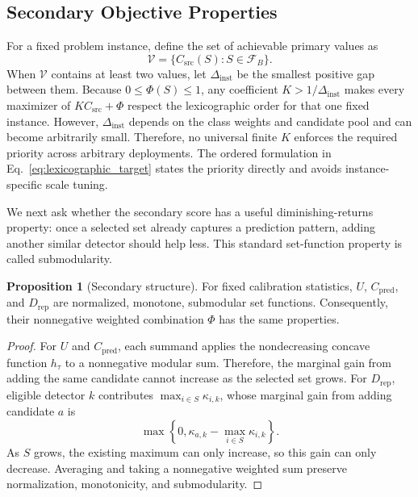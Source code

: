 \documentclass[conference]{IEEEtran}
\theoremstyle{definition}
\newtheorem{proposition}[theorem]{Proposition}
\begin{document}
\subsection{Secondary Objective Properties}
\label{app:secondary_structure}
For a fixed problem instance, define the set of achievable primary values as
\begin{equation}
\mathcal V=\{C_{\mathrm{src}}(S):S\in\mathcal F_B\}.
\end{equation}
When $\mathcal V$ contains at least two values, let $\Delta_{\mathrm{inst}}$ be the smallest positive gap between them.
Because $0\le\Phi(S)\le1$, any coefficient $K>1/\Delta_{\mathrm{inst}}$ makes every maximizer of $KC_{\mathrm{src}}+\Phi$ respect the lexicographic order for that one fixed instance.
However, $\Delta_{\mathrm{inst}}$ depends on the class weights and candidate pool and can become arbitrarily small.
Therefore, no universal finite $K$ enforces the required priority across arbitrary deployments.
The ordered formulation in Eq.~\ref{eq:lexicographic_target} states the priority directly and avoids instance-specific scale tuning.

We next ask whether the secondary score has a useful diminishing-returns property: once a selected set already captures a prediction pattern, adding another similar detector should help less.
This standard set-function property is called submodularity.
\begin{proposition}[Secondary structure]
\label{prop:secondary_structure}
For fixed calibration statistics, $U$, $C_{\mathrm{pred}}$, and $D_{\mathrm{rep}}$ are normalized, monotone, submodular set functions.
Consequently, their nonnegative weighted combination $\Phi$ has the same properties.
\end{proposition}

\begin{proof}
For $U$ and $C_{\mathrm{pred}}$, each summand applies the nondecreasing concave function $h_\tau$ to a nonnegative modular sum.
Therefore, the marginal gain from adding the same candidate cannot increase as the selected set grows.
For $D_{\mathrm{rep}}$, eligible detector $k$ contributes $\max_{i\in S}\kappa_{i,k}$, whose marginal gain from adding candidate $a$ is
\[
\max\left\{0,\kappa_{a,k}-\max_{i\in S}\kappa_{i,k}\right\}.
\]
As $S$ grows, the existing maximum can only increase, so this gain can only decrease.
Averaging and taking a nonnegative weighted sum preserve normalization, monotonicity, and submodularity.
\end{proof}
\end{document}
